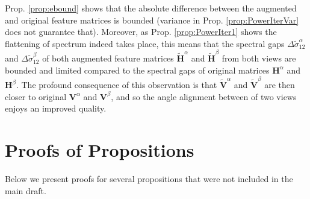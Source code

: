 

\begin{tcolorbox}[width=1.0\linewidth, colframe=blackish, colback=beaublue, boxsep=0mm, arc=2mm, left=2mm, right=2mm, top=2mm, bottom=2mm]
 Prop. \ref{prop:ebound} shows that the absolute difference between the augmented and  original feature matrices is bounded (variance in Prop. \ref{prop:PowerIterVar} does not guarantee that). Moreover, as Prop. \ref{prop:PowerIter1} shows the flattening of spectrum indeed takes place, this means that the spectral gaps $\Delta\tilde{\sigma}^\alpha_{12}$ and $\Delta\tilde{\sigma}^\beta_{12}$ of both augmented feature matrices   $\widetilde{\mathbf{H}}^\alpha$ and $\widetilde{\mathbf{H}}^\beta$ from both views are bounded and limited compared to the spectral gaps of original matrices ${\mathbf{H}}^\alpha$ and ${\mathbf{H}}^\beta$. The profound consequence of this observation is that $\widetilde{\mathbf{V}}^\alpha$ and $\widetilde{\mathbf{V}}^\beta$ are then closer to original ${\mathbf{V}}^\alpha$ and ${\mathbf{V}}^\beta$, and so the angle alignment between of two views enjoys an improved quality.  
%
\end{tcolorbox}

\section{Proofs of Propositions}

Below we present proofs for several propositions that were not included in the main draft. %

